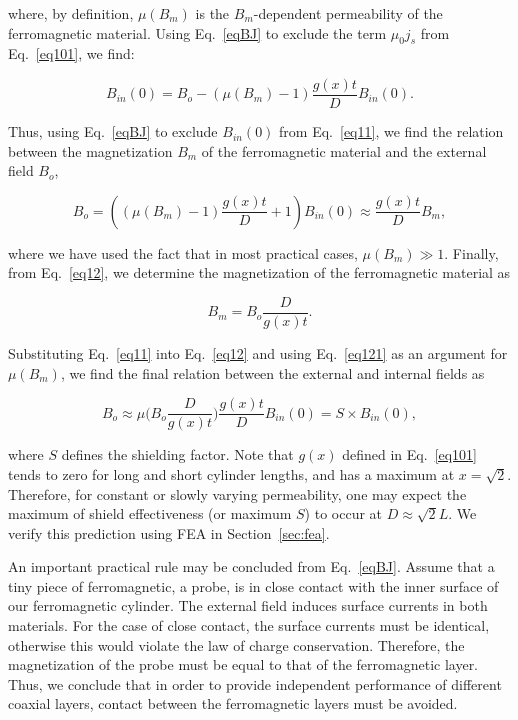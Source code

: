\documentclass[12pt]{article}
\begin{document}
\noindent
where, by definition, $\mu(B_m)$ is the $B_m$-dependent permeability of the  
ferromagnetic material. Using Eq.~\ref{eqBJ} to exclude the term $\mu_0 j_s$ 
from Eq.~\ref{eq101}, we find:

\begin{equation}
B_{in}(0) = B_o - (\mu(B_m) - 1) \frac{g(x)t}{D} B_{in}(0).
\label{eq11}
\end{equation}

\noindent
Thus, using Eq.~\ref{eqBJ} to exclude $B_{in}(0)$ from Eq.~\ref{eq11}, we find 
the relation between the magnetization $B_m$ of the ferromagnetic material and 
the external field $B_o$,

\begin{equation}
B_o = \left( (\mu(B_m)-1)\frac{g(x)t}{D}+1 \right) B_{in}(0) 
\approx \frac{g(x)t}{D}B_{m},
\label{eq12}
\end{equation}

\noindent
where we have used the fact that in most practical cases, $\mu(B_m)\gg1$. Finally, 
from Eq.~\ref{eq12}, we determine the magnetization of the ferromagnetic material
as

\begin{equation}
B_{m} = B_o\frac{D}{g(x)t}.
\label{eq121}
\end{equation}

\noindent
Substituting Eq.~\ref{eq11} into Eq.~\ref{eq12} and using Eq.~\ref{eq121} as an 
argument for $\mu(B_m)$, we find the final relation between the external and 
internal fields as

\begin{equation}
B_o \approx \mu\bigg(B_o 
\frac{D}{g(x)t}\bigg) \frac{g(x)t }{D} B_{in}(0) = S \times B_{in}(0),
\label{eqfinal}
\end{equation}

\noindent
where $S$ defines the shielding factor. Note that $g(x)$ defined in Eq.~\ref{eq101}
tends to zero for long and short cylinder lengths, and has a maximum at 
$x=\sqrt2$. Therefore, for constant or slowly varying permeability, one may  
expect the maximum of shield effectiveness (or maximum $S$) to occur at 
$D \approx \sqrt{2}L$. We verify this prediction using FEA in Section~\ref{sec:fea}.

An important practical rule may be  concluded from Eq.~\ref{eqBJ}. Assume  
that a tiny piece of ferromagnetic, a probe, is in close contact with the 
inner surface of our ferromagnetic cylinder. The external field induces 
surface currents in both materials. For the case of close contact, the surface 
currents must be identical, otherwise this would violate the law of charge  
conservation. Therefore, the magnetization of the probe must be equal 
to that of the ferromagnetic layer. Thus, we conclude that in order to 
provide independent performance of different coaxial layers, contact between  
the ferromagnetic layers must be avoided.
\end{document}
